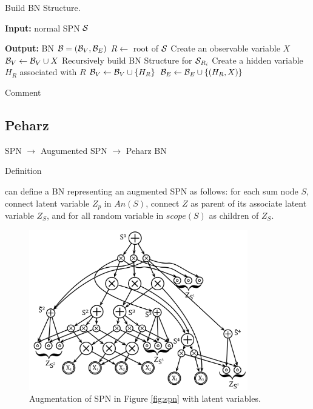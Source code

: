 \begin{algorithm}[!ht]
    \caption{\cite{zhao2015relationship} Build BN Structure.}
    \label{alg:poupart}
    \begin{algorithmic}[1]
        \item[\textbf{Input:} normal SPN $\cal S$]
        \item[\textbf{Output:} BN ${\cal B} = ({\cal B}_V, {\cal B}_E)$]
		\State $R \leftarrow$ root of ${\cal S}$
			\State Create an observable variable $X$
			\State ${\cal B}_V \leftarrow {\cal B}_V \cup X$
		\Else
					\State Recursively build BN Structure for ${\cal S}_{R_i}$
				\EndIf
			\EndFor
				\State Create a hidden variable $H_R$ associated with $R$
				\State ${\cal B}_V \leftarrow {\cal B}_V \cup \{H_R\}$
					\State ${\cal B}_E \leftarrow {\cal B}_E \cup \{(H_R,X)\}$
				\EndFor
			\EndIf
		\EndIf		
    \end{algorithmic}
\end{algorithm}

Comment

\subsection{Peharz}

SPN $\rightarrow$ Augumented SPN $\rightarrow$ Peharz BN

Definition

\cite{peharz2013greedy} can define a BN representing an augmented SPN as follows:
for each sum node $S$, connect latent variable $Z_p$ in $An(S)$, connect $Z$ as parent of its associate latent variable $Z_S$, and for all random variable in $scope(S)$ as children of $Z_S$.

\begin{figure}[h]
    \begin{center}
		\includegraphics[width=0.85\textwidth]{figures/aug_SPN.png}
		\caption{Augmentation of SPN in Figure \ref{fig:spn} with latent variables.}
	\label{fig:aug_spn}
    \end{center}
\end{figure}

